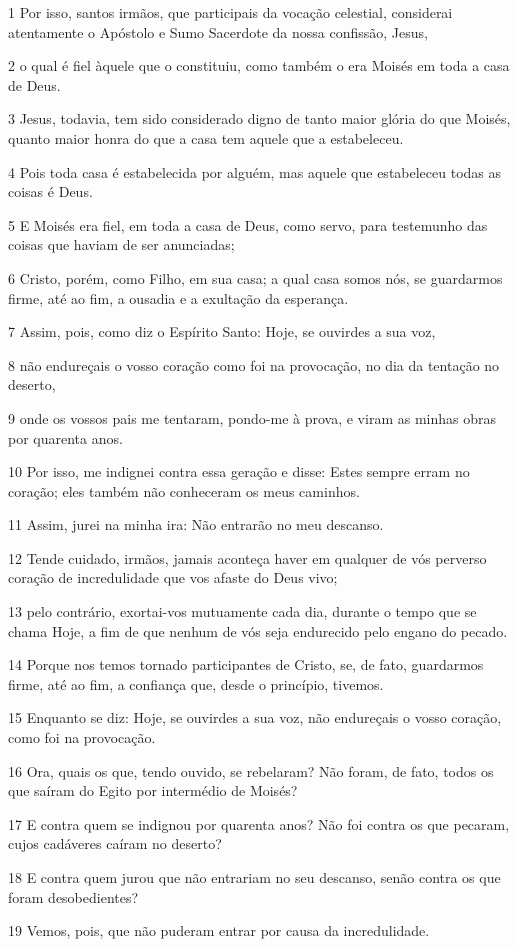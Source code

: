 \par 1 Por isso, santos irmãos, que participais da vocação celestial, considerai atentamente o Apóstolo e Sumo Sacerdote da nossa confissão, Jesus,
\par 2 o qual é fiel àquele que o constituiu, como também o era Moisés em toda a casa de Deus.
\par 3 Jesus, todavia, tem sido considerado digno de tanto maior glória do que Moisés, quanto maior honra do que a casa tem aquele que a estabeleceu.
\par 4 Pois toda casa é estabelecida por alguém, mas aquele que estabeleceu todas as coisas é Deus.
\par 5 E Moisés era fiel, em toda a casa de Deus, como servo, para testemunho das coisas que haviam de ser anunciadas;
\par 6 Cristo, porém, como Filho, em sua casa; a qual casa somos nós, se guardarmos firme, até ao fim, a ousadia e a exultação da esperança.
\par 7 Assim, pois, como diz o Espírito Santo: Hoje, se ouvirdes a sua voz,
\par 8 não endureçais o vosso coração como foi na provocação, no dia da tentação no deserto,
\par 9 onde os vossos pais me tentaram, pondo-me à prova, e viram as minhas obras por quarenta anos.
\par 10 Por isso, me indignei contra essa geração e disse: Estes sempre erram no coração; eles também não conheceram os meus caminhos.
\par 11 Assim, jurei na minha ira: Não entrarão no meu descanso.
\par 12 Tende cuidado, irmãos, jamais aconteça haver em qualquer de vós perverso coração de incredulidade que vos afaste do Deus vivo;
\par 13 pelo contrário, exortai-vos mutuamente cada dia, durante o tempo que se chama Hoje, a fim de que nenhum de vós seja endurecido pelo engano do pecado.
\par 14 Porque nos temos tornado participantes de Cristo, se, de fato, guardarmos firme, até ao fim, a confiança que, desde o princípio, tivemos.
\par 15 Enquanto se diz: Hoje, se ouvirdes a sua voz, não endureçais o vosso coração, como foi na provocação.
\par 16 Ora, quais os que, tendo ouvido, se rebelaram? Não foram, de fato, todos os que saíram do Egito por intermédio de Moisés?
\par 17 E contra quem se indignou por quarenta anos? Não foi contra os que pecaram, cujos cadáveres caíram no deserto?
\par 18 E contra quem jurou que não entrariam no seu descanso, senão contra os que foram desobedientes?
\par 19 Vemos, pois, que não puderam entrar por causa da incredulidade.

